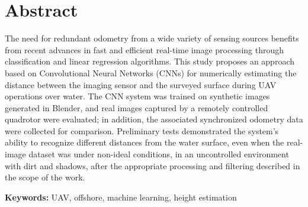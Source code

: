 \chapter*{Abstract}

The need for redundant odometry from a wide variety of sensing sources benefits from recent advances in fast and efficient real-time image processing through classification and linear regression algorithms. This study proposes an approach based on Convolutional Neural Networks (CNNs) for numerically estimating the distance between the imaging sensor and the surveyed surface during UAV operations over water. The CNN system was trained on synthetic images generated in Blender, and real images captured by a remotely controlled quadrotor were evaluated; in addition, the associated synchronized odometry data were collected for comparison. Preliminary tests demonstrated the system’s ability to recognize different distances from the water surface, even when the real-image dataset was under non-ideal conditions, in an uncontrolled environment with dirt and shadows, after the appropriate processing and filtering described in the scope of the work.

\vspace{.5cm}

\textbf{Keywords:} UAV, offshore, machine learning, height estimation
